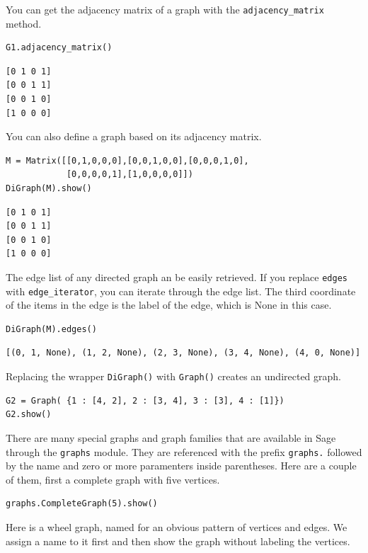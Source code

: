 \documentclass[10pt,]{book}
\theoremstyle{plain}
\theoremstyle{definition}
\theoremstyle{definition}
\theoremstyle{definition}
\theoremstyle{definition}
\theoremstyle{definition}
\numberwithin{equation}{section}
\begin{document}
You can get the adjacency matrix of a graph with the \lstinline?adjacency_matrix? method.
%
\begin{lstlisting}[style=sageinput]
G1.adjacency_matrix()
\end{lstlisting}
\begin{lstlisting}[style=sageoutput]
[0 1 0 1]
[0 0 1 1]
[0 0 1 0]
[1 0 0 0]
\end{lstlisting}
\par
You can also define a graph based on its adjacency matrix.%
\begin{lstlisting}[style=sageinput]
M = Matrix([[0,1,0,0,0],[0,0,1,0,0],[0,0,0,1,0],
			[0,0,0,0,1],[1,0,0,0,0]])
DiGraph(M).show()
\end{lstlisting}
\begin{lstlisting}[style=sageoutput]
[0 1 0 1]
[0 0 1 1]
[0 0 1 0]
[1 0 0 0]
\end{lstlisting}
\par
The edge list of any directed graph an be easily retrieved.  If you replace \lstinline?edges? with \lstinline?edge_iterator?, you can iterate through the edge list.  The third coordinate of the items in the edge is the label of the edge, which is None in this case.%
\begin{lstlisting}[style=sageinput]
DiGraph(M).edges()
\end{lstlisting}
\begin{lstlisting}[style=sageoutput]
[(0, 1, None), (1, 2, None), (2, 3, None), (3, 4, None), (4, 0, None)]
\end{lstlisting}
\par
Replacing the wrapper \lstinline?DiGraph()? with \lstinline?Graph()? creates an undirected graph.%
\begin{lstlisting}[style=sageinput]
G2 = Graph( {1 : [4, 2], 2 : [3, 4], 3 : [3], 4 : [1]})
G2.show()
\end{lstlisting}
\par
There are many special graphs and graph families that are available in Sage through the \lstinline?graphs? module.  They are referenced with the prefix \lstinline?graphs.? followed by the name and zero or more paramenters inside parentheses.  Here are a couple of them, first a complete graph with five vertices.%
\begin{lstlisting}[style=sageinput]
graphs.CompleteGraph(5).show()
\end{lstlisting}
\par
Here is a wheel graph, named for an obvious pattern of vertices and edges.  We assign a name to it first and then show the graph without labeling the vertices.%
\end{document}

